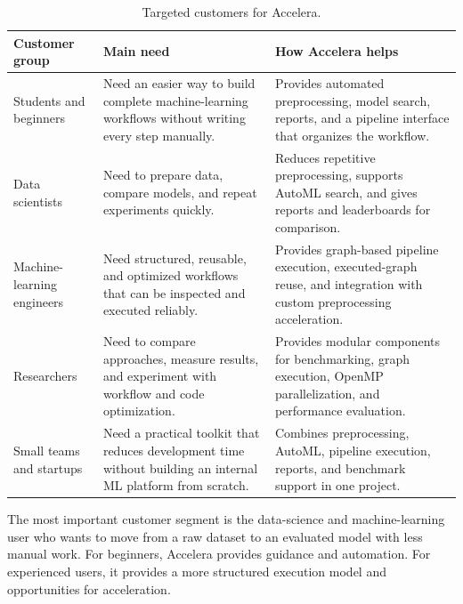 \documentclass[12pt,a4paper]{report}
\newcommand{\acceleraTableStyle}{%
\small
\renewcommand{\arraystretch}{1.15}
\setlength{\tabcolsep}{4pt}%
}
\begin{document}
\begin{table}[!htbp]
\centering
\acceleraTableStyle
\caption{Targeted customers for Accelera.}
\label{tab:target-customers}
\begin{tabular}{p{}p{}p{}}
\toprule
\textbf{Customer group} & \textbf{Main need} & \textbf{How Accelera helps} \\
\midrule

Students and beginners &
Need an easier way to build complete machine-learning workflows without writing
every step manually. &
Provides automated preprocessing, model search, reports, and a pipeline
interface that organizes the workflow. \\
\midrule

Data scientists &
Need to prepare data, compare models, and repeat experiments quickly. &
Reduces repetitive preprocessing, supports AutoML search, and gives reports and
leaderboards for comparison. \\
\midrule

Machine-learning engineers &
Need structured, reusable, and optimized workflows that can be inspected and
executed reliably. &
Provides graph-based pipeline execution, executed-graph reuse, and integration
with custom preprocessing acceleration. \\
\midrule

Researchers &
Need to compare approaches, measure results, and experiment with workflow and
code optimization. &
Provides modular components for benchmarking, graph execution, OpenMP
parallelization, and performance evaluation. \\
\midrule

Small teams and startups &
Need a practical toolkit that reduces development time without building an
internal ML platform from scratch. &
Combines preprocessing, AutoML, pipeline execution, reports, and benchmark
support in one project. \\

\bottomrule
\end{tabular}
\end{table}

\medskip
\noindent The most important customer segment is the data-science and machine-learning
user who wants to move from a raw dataset to an evaluated model with less manual
work. For beginners, Accelera provides guidance and automation. For experienced
users, it provides a more structured execution model and opportunities for
acceleration.
\end{document}
